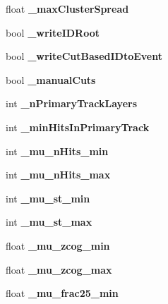 \begin{DoxyCompactItemize}
\item 
float {\bfseries \-\_\-max\-Cluster\-Spread}\label{classCALICE_1_1TBParticleID_a17558207406905a9fc632b3fe087ed60}

\item 
bool {\bfseries \-\_\-write\-I\-D\-Root}\label{classCALICE_1_1TBParticleID_a8ce610e6e3a491b2c9d16170bd257e7d}

\item 
bool {\bfseries \-\_\-write\-Cut\-Based\-I\-Dto\-Event}\label{classCALICE_1_1TBParticleID_a0029a02ec273b36da143fbe26c00e6e7}

\item 
bool {\bfseries \-\_\-manual\-Cuts}\label{classCALICE_1_1TBParticleID_a9f55cc706910a141791667a03065b1e9}

\item 
int {\bfseries \-\_\-n\-Primary\-Track\-Layers}\label{classCALICE_1_1TBParticleID_a5a9374663f7ef1289dbb17fa2f5338d6}

\item 
int {\bfseries \-\_\-min\-Hits\-In\-Primary\-Track}\label{classCALICE_1_1TBParticleID_a3de8a0e5d50e2142737d6ac60a2a7b56}

\item 
int {\bfseries \-\_\-mu\-\_\-n\-Hits\-\_\-min}\label{classCALICE_1_1TBParticleID_a793c2d6e9f029b9b72ea29a82f88b812}

\item 
int {\bfseries \-\_\-mu\-\_\-n\-Hits\-\_\-max}\label{classCALICE_1_1TBParticleID_aa23845b93c5abb51b3572af7428790e3}

\item 
int {\bfseries \-\_\-mu\-\_\-st\-\_\-min}\label{classCALICE_1_1TBParticleID_a6cb0e4575f7a716c5d8a93d97de2c101}

\item 
int {\bfseries \-\_\-mu\-\_\-st\-\_\-max}\label{classCALICE_1_1TBParticleID_a831e158c4f5a4f119c8ce05825c47778}

\item 
float {\bfseries \-\_\-mu\-\_\-zcog\-\_\-min}\label{classCALICE_1_1TBParticleID_a27922ccc3f90a610eaf17758c3a8a1b9}

\item 
float {\bfseries \-\_\-mu\-\_\-zcog\-\_\-max}\label{classCALICE_1_1TBParticleID_a4e9540cc8dec9cf6b34c20c388ba7b29}

\item 
float {\bfseries \-\_\-mu\-\_\-frac25\-\_\-min}\label{classCALICE_1_1TBParticleID_a28176b942d3fdf41b43d1f5b877f7c61}


\end{DoxyCompactItemize}
